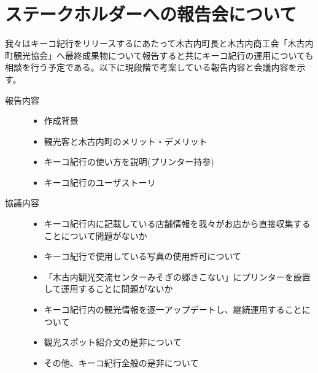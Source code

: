 \section{ステークホルダーへの報告会について}
我々はキーコ紀行をリリースするにあたって木古内町長と木古内商工会「木古内町観光協会」へ最終成果物について報告すると共にキーコ紀行の運用についても相談を行う予定である。以下に現段階で考案している報告内容と会議内容を示す。
\begin{description}
 \item[報告内容]\mbox{}
 	\begin{itemize}
	\item 作成背景
	\item 観光客と木古内町のメリット・デメリット
	\item キーコ紀行の使い方を説明(プリンター持参)
	\item キーコ紀行のユーザストーリ \\
	\end{itemize}
 \item[協議内容]\mbox{}
	\begin{itemize}
	\item キーコ紀行内に記載している店舗情報を我々がお店から直接収集することについて問題がないか
	\item キーコ紀行で使用している写真の使用許可について
	\item 「木古内観光交流センターみそぎの郷きこない」にプリンターを設置して運用することに問題がないか
	\item キーコ紀行内の観光情報を逐一アップデートし、継続運用することについて
	\item 観光スポット紹介文の是非について
	\item その他、キーコ紀行全般の是非について
	\end{itemize}
\end{description}

